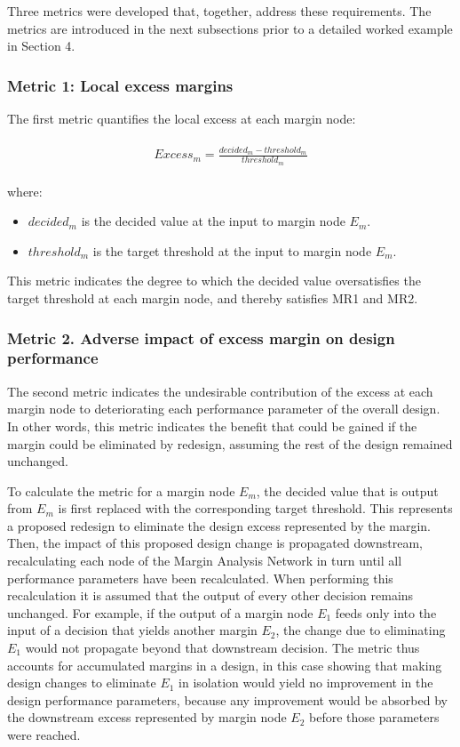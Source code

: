 Three metrics were developed that, together, address these requirements. The metrics are introduced in the next subsections prior to a detailed worked example in Section 4.

\subsubsection{Metric 1: Local excess margins}\label{localmargin}

The first metric quantifies the local excess at each margin node:

\begin{align}
\begin{split}
\label{eq:excess}
Excess_{m}=\frac{decided_m - threshold_m}{threshold_m}
\end{split}
\end{align}

where:

\begin{itemize}
\item $decided_m$ is the decided value at the input to margin node $E_m$.
\item $threshold_m$ is the target threshold at the input to margin node $E_m$.
\end{itemize}

This metric indicates the degree to which the decided value oversatisfies the target threshold at each margin node, and thereby satisfies MR1 and MR2.

\subsubsection{Metric 2. Adverse impact of excess margin on design performance}\label{forwardpass}

The second metric indicates the undesirable contribution of the excess at each margin node to deteriorating each performance parameter of the overall design. In other words, this metric indicates the benefit that could be gained if the margin could be eliminated by redesign, assuming the rest of the design remained unchanged.

To calculate the metric for a margin node $E_m$, the decided value that is output from $E_m$ is first replaced with the corresponding target threshold. This represents a proposed redesign to eliminate the design excess represented by the margin. Then, the impact of this proposed design change is propagated downstream, recalculating each node of the Margin Analysis Network in turn until all performance parameters have been recalculated. When performing this recalculation it is assumed that the output of every other decision remains unchanged. For example, if the output of a margin node $E_1$ feeds only into the input of a decision that yields another margin $E_2$, the change due to eliminating $E_1$ would not propagate beyond that downstream decision. The metric thus accounts for accumulated margins in a design, in this case showing that making design changes to eliminate $E_1$ in isolation would yield no improvement in the design performance parameters, because any improvement would be absorbed by the downstream excess represented by margin node $E_2$ before those parameters were reached.

